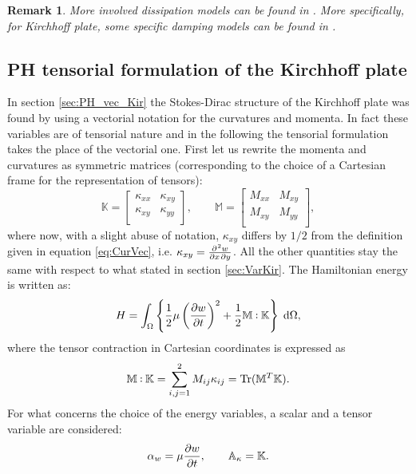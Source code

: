 \documentclass[preprint,12pt]{elsarticle}
\DeclareMathOperator{\Tr}{Tr}
\newtheorem{remark}{Remark}
\newcommand{\secondReviewer}[1]{\textcolor{blue!80!black}{#1}}
\def\onedot{$\mathsurround0pt\ldotp$}
\def\cddot{%
	\mathbin{\vcenter{\baselineskip.67ex
			\hbox{\onedot}\hbox{\onedot}}%
}}
\begin{document}
\begin{remark}
More involved dissipation models can be found in \cite{DissDenis}. More specifically, for Kirchhoff plate, some specific damping models can be found in \cite{LambourgJASA}.
\end{remark}	


\subsection{PH tensorial formulation of the Kirchhoff plate}
\label{sec:PH_ten_Kir}

In section \ref{sec:PH_vec_Kir} the Stokes-Dirac structure of the Kirchhoff plate was found by using a vectorial notation for the curvatures and momenta. \secondReviewer{In fact} these variables are of tensorial nature and in the following the tensorial formulation takes the place of the vectorial one. First let us rewrite the momenta and curvatures as symmetric matrices (corresponding to the choice of a Cartesian frame for the representation of tensors):
\begin{equation}
\mathbb{K} = 
\begin{bmatrix}
\kappa_{xx} &  \kappa_{xy}\\
\kappa_{xy} & \kappa_{yy} \\
\end{bmatrix}, \qquad
\mathbb{M} =
\begin{bmatrix}
M_{xx} & M_{xy} \\
M_{xy} & M_{yy} \\
\end{bmatrix},
\end{equation}
where now, with a slight abuse of notation, $\kappa_{xy}$ \secondReviewer{differs by $1/2$ from the definition given in equation \eqref{eq:CurVec}}, i.e. $\kappa_{xy} =\diffp{w}{x,y}$. All the other quantities stay the same with respect to what stated in section \ref{sec:VarKir}. The Hamiltonian energy is written as:
\begin{equation}
\label{eq:H_Kir_Ten}
H = \int_{\Omega} \left\{ \frac{1}{2} \mu \left(\diffp{w}{t} \right)^2 + \frac{1}{2} \mathbb{M} \cddot \mathbb{K}  \right\}  \d{\Omega} ,
\end{equation}
where the tensor contraction in Cartesian coordinates is expressed as
\[\mathbb{M} \cddot \mathbb{K} = \sum_{i,j = 1}^{2} M_{ij} \kappa_{ij} = \Tr(\mathbb{M}^T \mathbb{K}). \]
For what concerns the choice of the energy variables, a scalar and a tensor variable are considered:
\begin{equation}
\alpha_w = \mu \diffp{w}{t}, \qquad \mathbb{A}_{\kappa} = \mathbb{K}.	\end{equation}
\end{document}
